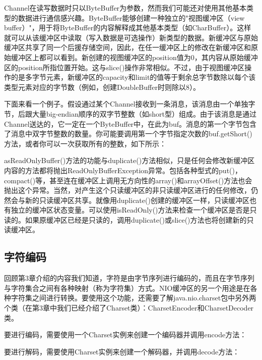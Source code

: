 		Channel在读写数据时只以ByteBuffer为参数，然而我们可能还对使用其他基本类型的数据进行通信感兴趣。ByteBuffer能够创建一种独立的"视图缓冲区（view buffer）"，用于将ByteBuffer的内容解释成其他基本类型（如CharBuffer）。这样就可以从该缓冲区中读取（写入数据是可选操作）新类型的数据。新缓冲区与原始缓冲区共享了同一个后援存储空间，因此，在任一缓冲区上的修改在新缓冲区和原始缓冲区上都可以看到。新创建的视图缓冲区的position值为0，其内容从原始缓冲区的position所指位置开始。这与slice()操作非常相似。不过，由于视图缓冲区操作的是多字节元素，新缓冲区的capacity和limit的值等于剩余总字节数除以每个该类型元素对应的字节数（例如，创建DoubleBuffer时则除以8）。 

		下面来看一个例子。假设通过某个Channel接收到一条消息，该消息由一个单独字节，后跟大量big-endian顺序的双字节整数（如short型）组成。由于该消息是通过Channel送达的，它一定在一个ByteBuffer中，在此为buf。消息的第一个字节包含了消息中双字节整数的数量。你可能要调用第一个字节指定次数的buf.getShort()方法，或者你可以一次获取所有的整数，如下所示： 

		

		asReadOnlyBuffer()方法的功能与duplicate()方法相似，只是任何会修改新缓冲区内容的方法都将抛出ReadOnlyBufferException异常。包括各种型式的put()，compact()等，甚至连在缓冲区上调用无方向性的array()和arrayOffset()方法也会抛出这个异常。当然，对产生这个只读缓冲区的非只读缓冲区进行的任何修改，仍然会与新的只读缓冲区共享。就像用duplicate()创建的缓冲区一样，只读缓冲区也有独立的缓冲区状态变量。可以使用isReadOnly()方法来检查一个缓冲区是否是只读的。如果原缓冲区已经是只读的，调用duplicate()或slice()方法也将创建新的只读缓冲区。 

	\subsection{字符编码}

		回顾第3章介绍的内容我们知道，字符是由字节序列进行编码的，而且在字节序列与字符集合之间有各种映射（称为字符集）方式。NIO缓冲区的另一个用途是在各种字符集之间进行转换。要使用这个功能，还需要了解java.nio.charset包中另外两个类（在第3章中我们已经介绍了Charset类）：CharsetEncoder和CharsetDecoder类。 

		要进行编码，需要使用一个Charset实例来创建一个编码器并调用encode方法： 

		

		要进行解码，需要使用Charset实例来创建一个解码器，并调用decode方法： 

